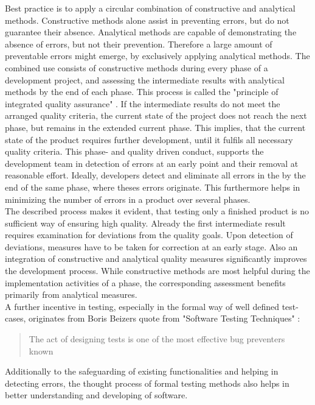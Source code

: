 	Best practice is to apply a circular combination of constructive and analytical methods. Constructive methods alone assist in preventing errors, but do not guarantee their absence. Analytical methods are capable of demonstrating the absence of errors, but not their prevention. Therefore a large amount of preventable errors might emerge, by exclusively applying analytical methods. The combined use consists of constructive methods during every phase of a development project, and assessing the intermediate results with analytical methods by the end of each phase. This process is called the "principle of integrated quality assurance" \cite{Liggesmeyer2002}. If the intermediate results do not meet the arranged quality criteria, the current state of the project does not reach the next phase, but remains in the extended current phase. This implies, that the current state of the product requires further development, until it fulfils all necessary quality criteria. This phase- and quality driven conduct, supports the development team in detection of errors at an early point and their removal at reasonable effort. Ideally, developers detect and eliminate all errors in the by the end of the same phase, where theses errors originate. This furthermore helps in minimizing the number of errors in a product over several phases. \\
	
	The described process makes it evident, that testing only a finished product is no sufficient way of ensuring high quality. Already the first intermediate result requires examination for deviations from the quality goals. Upon detection of deviations, measures have to be taken for correction at an early stage. Also an integration of constructive and analytical quality measures significantly improves the development process. While constructive methods are most helpful during the implementation activities of a phase, the corresponding assessment benefits primarily from analytical measures. \\
	
	A further incentive in testing, especially in the formal way of well defined test-cases, originates from Boris Beizers quote from "Software Testing Techniques" \cite{Beizer90}:  
	\begin{quote}
	The act of designing tests is one of the most effective bug preventers known %
	\end{quote}
	Additionally to the safeguarding of existing functionalities and helping in detecting errors, the thought process of formal testing methods also helps in better understanding and developing of software. \\

